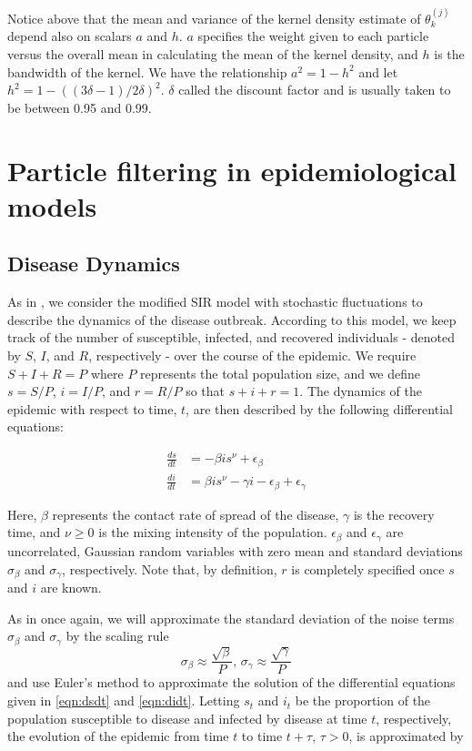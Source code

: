 \documentclass{article}
\begin{document}
Notice above that the mean and variance of the kernel density estimate of $\theta_k^{(j)}$ depend also on scalars $a$ and $h$.  $a$ specifies the weight given to each particle versus the overall mean in calculating the mean of the kernel density, and $h$ is the bandwidth of the kernel. We have the relationship $a^2 = 1 - h^2$ and let $h^2 = 1 - ((3\delta - 1)/2\delta)^2$.  $\delta$ called the discount factor and is usually taken to be between 0.95 and 0.99.


\section{Particle filtering in epidemiological models \label{sec:apply}}

\subsection{Disease Dynamics}

As in \citet{skvortsov2012monitoring}, we consider the modified SIR model with stochastic fluctuations to describe the dynamics of the disease outbreak.  According to this model, we keep track of the number of susceptible, infected, and recovered individuals - denoted by $S$, $I$, and $R$, respectively - over the course of the epidemic.  We require $S + I + R = P$ where $P$ represents the total population size, and we define $s = S/P$, $i = I/P$, and $r = R/P$ so that $s + i + r = 1$.  The dynamics of the epidemic with respect to time, $t$, are then described by the following differential equations:

\begin{align}
\frac{ds}{dt} &= -\beta is^\nu + \epsilon_\beta \label{eqn:dsdt} \\
\frac{di}{dt} &= \beta is^\nu - \gamma i - \epsilon_\beta + \epsilon_\gamma \label{eqn:didt}
\end{align}

\noindent Here, $\beta$ represents the contact rate of spread of the disease, $\gamma$ is the recovery time, and $\nu \ge 0$ is the mixing intensity of the population.  $\epsilon_\beta$ and $\epsilon_\gamma$ are uncorrelated, Gaussian random variables with zero mean and standard deviations $\sigma_\beta$ and $\sigma_\gamma$, respectively.  Note that, by definition, $r$ is completely specified once $s$ and $i$ are known.

As in \citet{skvortsov2012monitoring} once again, we will approximate the standard deviation of the noise terms $\sigma_\beta$ and $\sigma_\gamma$ by the scaling rule \[\sigma_\beta \approx \frac{\sqrt{\beta}}{P} \mbox{, } \sigma_\gamma \approx \frac{\sqrt{\gamma}}{P}\] and use Euler's method to approximate the solution of the differential equations given in \eqref{eqn:dsdt} and \eqref{eqn:didt}.  Letting $s_t$ and $i_t$ be the proportion of the population susceptible to disease and infected by disease at time $t$, respectively, the evolution of the epidemic from time $t$ to time $t + \tau$, $\tau > 0$, is approximated by
\end{document}

